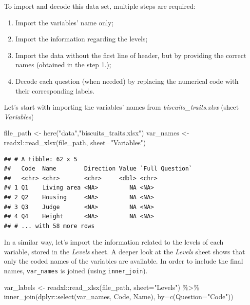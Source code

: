 \documentclass[
]{krantz}
\makeatletter
\newenvironment{Shaded}{\begin{snugshade}}{\end{snugshade}}
\newcommand{\AttributeTok}[1]{\textcolor[rgb]{0.61,0.61,0.61}{#1}}
\newcommand{\FunctionTok}[1]{\textcolor[rgb]{0,0,0}{#1}}
\newcommand{\NormalTok}[1]{#1}
\newcommand{\OtherTok}[1]{\textcolor[rgb]{0.37,0.37,0.37}{#1}}
\newcommand{\SpecialCharTok}[1]{\textcolor[rgb]{0,0,0}{#1}}
\newcommand{\StringTok}[1]{\textcolor[rgb]{0.5,0.5,0.5}{#1}}
\providecommand{\tightlist}{%
  \setlength{\itemsep}{0pt}\setlength{\parskip}{0pt}}
\newenvironment{kframe}{%
\medskip{}
\setlength{\fboxsep}{.8em}
 \def\at@end@of@kframe{}%
 \ifinner\ifhmode%
  \def\at@end@of@kframe{\end{minipage}}%
  \begin{minipage}{\columnwidth}%
 \fi\fi%
 \def\FrameCommand##1{\hskip\@totalleftmargin \hskip-\fboxsep
 \colorbox{shadecolor}{##1}\hskip-\fboxsep
     \hskip-\linewidth \hskip-\@totalleftmargin \hskip\columnwidth}%
 \MakeFramed {\advance\hsize-\width
   \@totalleftmargin\z@ \linewidth\hsize
   \@setminipage}}%
 {\par\unskip\endMakeFramed%
 \at@end@of@kframe}
\renewenvironment{Shaded}{\begin{kframe}}{\end{kframe}}
\makeatother
\begin{document}
To import and decode this data set, multiple steps are required:

\begin{enumerate}
\def\labelenumi{\arabic{enumi}.}
\tightlist
\item
  Import the variables' name only;
\item
  Import the information regarding the levels;
\item
  Import the data without the first line of header, but by providing the correct names (obtained in the step 1.);
\item
  Decode each question (when needed) by replacing the numerical code with their corresponding labels.
\end{enumerate}

Let's start with importing the variables' names from \emph{biscuits\_traits.xlsx} (sheet \emph{Variables})

\begin{Shaded}
\begin{Highlighting}[]
\NormalTok{file\_path }\OtherTok{\textless{}{-}} \FunctionTok{here}\NormalTok{(}\StringTok{"data"}\NormalTok{,}\StringTok{"biscuits\_traits.xlsx"}\NormalTok{) }
\NormalTok{var\_names }\OtherTok{\textless{}{-}}\NormalTok{ readxl}\SpecialCharTok{::}\FunctionTok{read\_xlsx}\NormalTok{(file\_path, }\AttributeTok{sheet=}\StringTok{"Variables"}\NormalTok{)}
\end{Highlighting}
\end{Shaded}

\begin{verbatim}
## # A tibble: 62 x 5
##   Code  Name        Direction Value `Full Question`
##   <chr> <chr>       <chr>     <dbl> <chr>          
## 1 Q1    Living area <NA>         NA <NA>           
## 2 Q2    Housing     <NA>         NA <NA>           
## 3 Q3    Judge       <NA>         NA <NA>           
## 4 Q4    Height      <NA>         NA <NA>           
## # ... with 58 more rows
\end{verbatim}

In a similar way, let's import the information related to the levels of each variable, stored in the \emph{Levels} sheet.
A deeper look at the \emph{Levels} sheet shows that only the coded names of the variables are available. In order to include the final names, \texttt{var\_names} is joined (using \texttt{inner\_join}).

\begin{Shaded}
\begin{Highlighting}[]
\NormalTok{var\_labels }\OtherTok{\textless{}{-}}\NormalTok{ readxl}\SpecialCharTok{::}\FunctionTok{read\_xlsx}\NormalTok{(file\_path, }\AttributeTok{sheet=}\StringTok{"Levels"}\NormalTok{) }\SpecialCharTok{\%\textgreater{}\%} 
  \FunctionTok{inner\_join}\NormalTok{(dplyr}\SpecialCharTok{::}\FunctionTok{select}\NormalTok{(var\_names, Code, Name), }
             \AttributeTok{by=}\FunctionTok{c}\NormalTok{(}\AttributeTok{Question=}\StringTok{"Code"}\NormalTok{))}
\end{Highlighting}
\end{Shaded}
\end{document}

